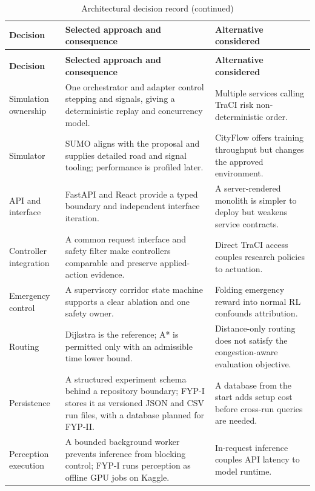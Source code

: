 \begin{longtable}{P{0.20\textwidth}P{0.34\textwidth}P{0.35\textwidth}}
\caption{Architectural decision record}\label{tab:decisions}\\
\toprule
\textbf{Decision} & \textbf{Selected approach and consequence} & \textbf{Alternative considered}\\
\midrule\endfirsthead
\caption[]{Architectural decision record (continued)}\\
\toprule
\textbf{Decision} & \textbf{Selected approach and consequence} & \textbf{Alternative considered}\\
\midrule\endhead
Simulation ownership & One orchestrator and adapter control stepping and signals, giving a deterministic replay and concurrency model. & Multiple services calling TraCI risk non-deterministic order.\\
Simulator & SUMO aligns with the proposal and supplies detailed road and signal tooling; performance is profiled later. & CityFlow offers training throughput but changes the approved environment.\\
API and interface & FastAPI and React provide a typed boundary and independent interface iteration. & A server-rendered monolith is simpler to deploy but weakens service contracts.\\
Controller integration & A common request interface and safety filter make controllers comparable and preserve applied-action evidence. & Direct TraCI access couples research policies to actuation.\\
Emergency control & A supervisory corridor state machine supports a clear ablation and one safety owner. & Folding emergency reward into normal RL confounds attribution.\\
Routing & Dijkstra is the reference; A* is permitted only with an admissible time lower bound. & Distance-only routing does not satisfy the congestion-aware evaluation objective.\\
Persistence & A structured experiment schema behind a repository boundary; FYP-I stores it as versioned JSON and CSV run files, with a database planned for FYP-II. & A database from the start adds setup cost before cross-run queries are needed.\\
Perception execution & A bounded background worker prevents inference from blocking control; FYP-I runs perception as offline GPU jobs on Kaggle. & In-request inference couples API latency to model runtime.\\
\bottomrule
\end{longtable}

